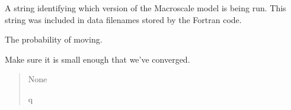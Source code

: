 \documentclass[letterpaper,10pt,english]{sphinxmanual}
\begin{document}
\begin{fulllineitems}
\begin{fulllineitems}
\begin{quote}
\begin{description}
\end{description}\end{quote}

\end{fulllineitems}


\begin{fulllineitems}
\label{\detokenize{lysis.util:lysis.util.parameters.MacroParameters.macro_version}}
\pysigstartsignatures
{}
\pysigstopsignatures
\sphinxAtStartPar
A string identifying which version of the Macroscale model is being run.
This string was included in data filenames stored by the Fortran code.

\end{fulllineitems}


\begin{fulllineitems}
\label{\detokenize{lysis.util:lysis.util.parameters.MacroParameters.moving_probability}}
\pysigstartsignatures
{}
\pysigstopsignatures
\sphinxAtStartPar
The probability of moving.

\sphinxAtStartPar
Make sure it is small enough that we’ve converged.
\begin{quote}\begin{description}
\sphinxAtStartPar
None

\sphinxAtStartPar
q

\end{description}\end{quote}

\end{fulllineitems}



\end{fulllineitems}
\end{document}
